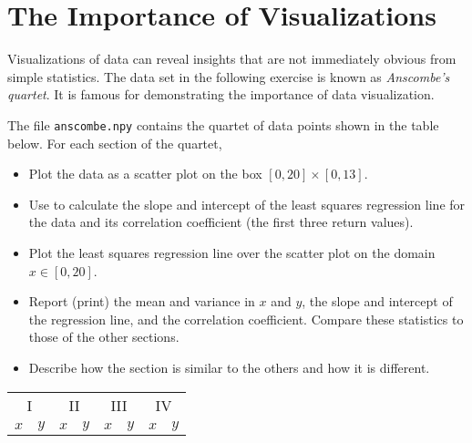\label{lab:DataVis}

\section*{The Importance of Visualizations} %

Visualizations of data can reveal insights that are not immediately obvious from simple statistics.
The data set in the following exercise is known as \emph{Anscombe's quartet}.
It is famous for demonstrating the importance of data visualization.

\begin{problem} %
The file \texttt{anscombe.npy} contains the quartet of data points shown in the table below.
For each section of the quartet,
\begin{itemize}
	\setlength\itemsep{0em}
	\item Plot the data as a scatter plot on the box $[0,20]\times[0,13]$.
    \item Use  to calculate the slope and intercept of the least squares regression line for the data and its correlation coefficient (the first three return values).
	\item Plot the least squares regression line over the scatter plot on the domain $x \in [0,20]$.
	\item Report (print) the mean and variance in $x$ and $y$, the slope and intercept of the regression line, and the correlation coefficient.
    Compare these statistics to those of the other sections.
	\item Describe how the section is similar to the others and how it is different.
\end{itemize}
\begin{table}[H]
\scriptsize{
\begin{tabular}{rr|rr|rr|rr}
    \multicolumn{2}{c|}{I}    & \multicolumn{2}{|c|}{II} &
    \multicolumn{2}{|c|}{III} & \multicolumn{2}{|c}{IV} \\
    \multicolumn{1}{c}{$x$}   & \multicolumn{1}{c|}{$y$} &
    \multicolumn{1}{|c}{$x$}  & \multicolumn{1}{c|}{$y$} &
    \multicolumn{1}{|c}{$x$}  & \multicolumn{1}{c|}{$y$} &
    \multicolumn{1}{|c}{$x$}  & \multicolumn{1}{c}{$y$} \\

\end{tabular}}
\end{table}
\end{problem}
